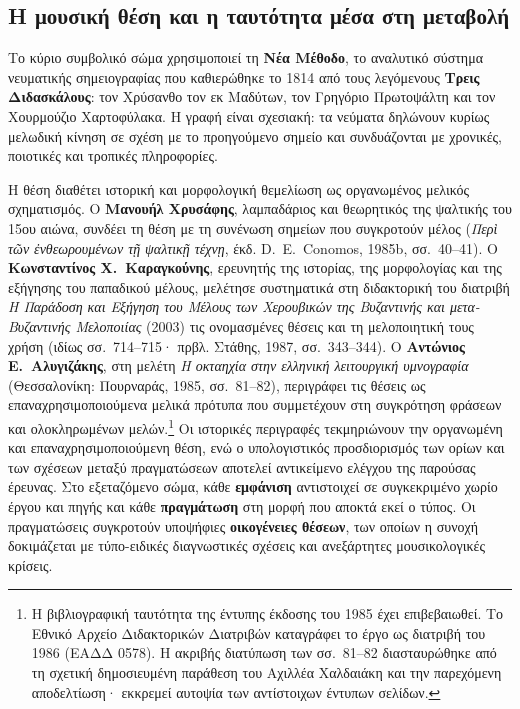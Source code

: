 \documentclass[11pt,a4paper]{article}
\begin{document}
\subsection{Η μουσική θέση και η ταυτότητα μέσα στη μεταβολή}

Το κύριο συμβολικό σώμα χρησιμοποιεί τη \textbf{Νέα Μέθοδο}, το αναλυτικό σύστημα νευματικής σημειογραφίας που καθιερώθηκε το 1814 από τους λεγόμενους \textbf{Τρεις Διδασκάλους}: τον Χρύσανθο τον εκ Μαδύτων, τον Γρηγόριο Πρωτοψάλτη και τον Χουρμούζιο Χαρτοφύλακα. Η γραφή είναι σχεσιακή: τα νεύματα δηλώνουν κυρίως μελωδική κίνηση σε σχέση με το προηγούμενο σημείο και συνδυάζονται με χρονικές, ποιοτικές και τροπικές πληροφορίες.

Η θέση διαθέτει ιστορική και μορφολογική θεμελίωση ως οργανωμένος μελικός σχηματισμός. Ο \textbf{Μανουήλ Χρυσάφης}, λαμπαδάριος και θεωρητικός της ψαλτικής του 15ου αιώνα, συνδέει τη θέση με τη συνένωση σημείων που συγκροτούν μέλος (\emph{Περὶ τῶν ἐνθεωρουμένων τῇ ψαλτικῇ τέχνῃ}, έκδ. D.~E.~Conomos, 1985b, σσ.~40--41). Ο \textbf{Κωνσταντίνος Χ.~Καραγκούνης}, ερευνητής της ιστορίας, της μορφολογίας και της εξήγησης του παπαδικού μέλους, μελέτησε συστηματικά στη διδακτορική του διατριβή \emph{Η Παράδοση και Εξήγηση του Μέλους των Χερουβικών της Βυζαντινής και μετα-Βυζαντινής Μελοποιίας} (2003) τις ονομασμένες θέσεις και τη μελοποιητική τους χρήση (ιδίως σσ.~714--715· πρβλ. Στάθης, 1987, σσ.~343--344). Ο \textbf{Αντώνιος Ε.~Αλυγιζάκης}, στη μελέτη \emph{Η οκταηχία στην ελληνική λειτουργική υμνογραφία} (Θεσσαλονίκη: Πουρναράς, 1985, σσ.~81--82), περιγράφει τις θέσεις ως επαναχρησιμοποιούμενα μελικά πρότυπα που συμμετέχουν στη συγκρότηση φράσεων και ολοκληρωμένων μελών.\footnote{Η βιβλιογραφική ταυτότητα της έντυπης έκδοσης του 1985 έχει επιβεβαιωθεί. Το Εθνικό Αρχείο Διδακτορικών Διατριβών καταγράφει το έργο ως διατριβή του 1986 (ΕΑΔΔ 0578). Η ακριβής διατύπωση των σσ.~81--82 διασταυρώθηκε από τη σχετική δημοσιευμένη παράθεση του Αχιλλέα Χαλδαιάκη και την παρεχόμενη αποδελτίωση· εκκρεμεί αυτοψία των αντίστοιχων έντυπων σελίδων.} Οι ιστορικές περιγραφές τεκμηριώνουν την οργανωμένη και επαναχρησιμοποιούμενη θέση, ενώ ο υπολογιστικός προσδιορισμός των ορίων και των σχέσεων μεταξύ πραγματώσεων αποτελεί αντικείμενο ελέγχου της παρούσας έρευνας. Στο εξεταζόμενο σώμα, κάθε \textbf{εμφάνιση} αντιστοιχεί σε συγκεκριμένο χωρίο έργου και πηγής και κάθε \textbf{πραγμάτωση} στη μορφή που αποκτά εκεί ο τύπος. Οι πραγματώσεις συγκροτούν υποψήφιες \textbf{οικογένειες θέσεων}, των οποίων η συνοχή δοκιμάζεται με τύπο-ειδικές διαγνωστικές σχέσεις και ανεξάρτητες μουσικολογικές κρίσεις.
\end{document}
